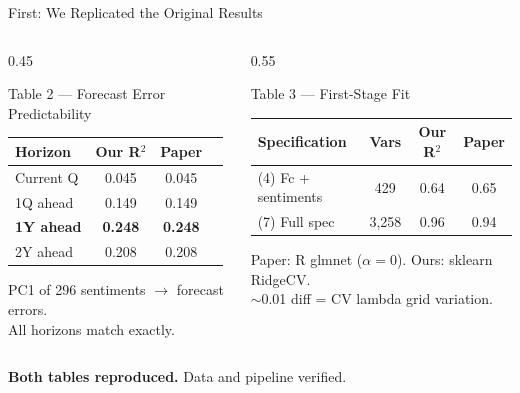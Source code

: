\documentclass[10pt,aspectratio=169]{beamer}
\begin{document}
\begin{frame}{First: We Replicated the Original Results}
  \vspace{4pt}
  \begin{columns}[T]
    \begin{column}{0.45\textwidth}
      \begin{block}{Table 2 — Forecast Error Predictability}
        \centering\small
        \begin{tabular}{lccc}
          \toprule
          Horizon & Our R$^2$ & Paper \\
          \midrule
          Current Q & 0.045 & 0.045 \\
          1Q ahead  & 0.149 & 0.149 \\
          \textbf{1Y ahead} & \textbf{0.248} & \textbf{0.248} \\
          2Y ahead  & 0.208 & 0.208 \\
          \bottomrule
        \end{tabular}
        \vspace{2pt}
        {\footnotesize PC1 of 296 sentiments $\to$ forecast errors.\\All horizons match exactly.}
      \end{block}
    \end{column}
    \begin{column}{0.55\textwidth}
      \begin{block}{Table 3 — First-Stage Fit}
        \centering\footnotesize
        \begin{tabular}{lccc}
          \toprule
          Specification & Vars & Our R$^2$ & Paper \\
          \midrule
          (4) Fc + sentiments & 429 & 0.64 & 0.65 \\
          (7) Full spec & 3,258 & 0.96 & 0.94 \\
          \bottomrule
        \end{tabular}
        \vspace{2pt}
        {\footnotesize Paper: R glmnet ($\alpha=0$). Ours: sklearn RidgeCV.\\$\sim$0.01 diff = CV lambda grid variation.}
      \end{block}
    \end{column}
  \end{columns}
  \vspace{6pt}
  \begin{center}
    \small\textbf{Both tables reproduced.} Data and pipeline verified.
  \end{center}
\end{frame}
\end{document}
